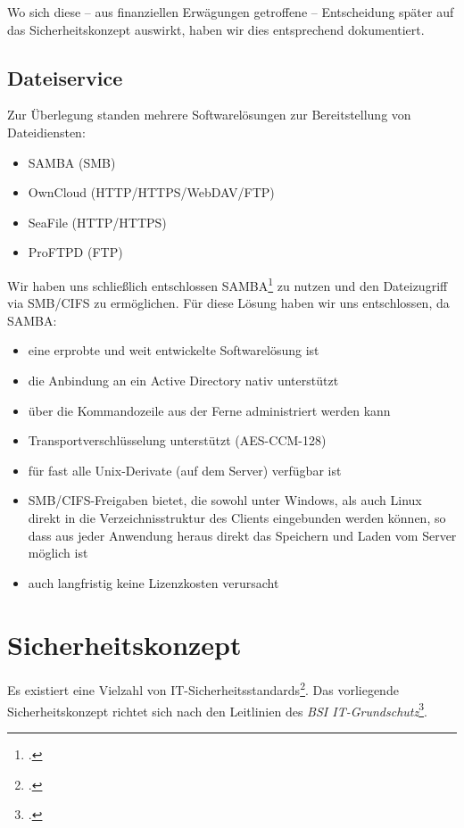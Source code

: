 Wo sich diese -- aus finanziellen Erwägungen getroffene -- Entscheidung später auf das Sicherheitskonzept auswirkt, haben wir dies entsprechend dokumentiert.

\subsection{Dateiservice}
Zur Überlegung standen mehrere Softwarelösungen zur Bereitstellung von Dateidiensten:

\begin{itemize}
\item SAMBA (SMB)
\item OwnCloud (HTTP/HTTPS/WebDAV/FTP)
\item SeaFile (HTTP/HTTPS)
\item ProFTPD (FTP)
\end{itemize}
Wir haben uns schließlich entschlossen SAMBA\footcite{samba} zu nutzen und den Dateizugriff via SMB/CIFS zu ermöglichen. Für diese Lösung haben wir uns entschlossen, da SAMBA:

\begin{itemize}
\item eine erprobte und weit entwickelte Softwarelösung ist
\item die Anbindung an ein Active Directory nativ unterstützt
\item über die Kommandozeile aus der Ferne administriert werden kann
\item Transportverschlüsselung unterstützt (AES-CCM-128)
\item für fast alle Unix-Derivate (auf dem Server) verfügbar ist
\item SMB/CIFS-Freigaben bietet, die sowohl unter Windows, als auch Linux direkt in die Verzeichnisstruktur des Clients eingebunden werden können, so dass aus jeder Anwendung heraus direkt das Speichern und Laden vom Server möglich ist
\item auch langfristig keine Lizenzkosten verursacht
\end{itemize}

\newpage
\section{Sicherheitskonzept}
\label{sec:sicherheitskonzept}
Es existiert eine Vielzahl von IT-Sicherheitsstandards\footcite{wikiCyberSecStandards}. Das vorliegende Sicherheitskonzept richtet sich nach den Leitlinien des \emph{BSI IT-Grundschutz}\footcite{grundschutz}.\\

